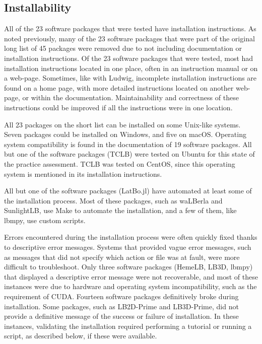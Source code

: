 \documentclass[final, 3p, times, authoryear]{elsarticle}
\begin{document}
\subsection{Installability}

All of the 23 software packages that were tested have installation instructions.
As noted previously, many of the 23 software packages that were part of the
original long list of 45 packages were removed due to not including
documentation or installation instructions. Of the 23 software packages that
were tested, most had installation instructions located in one place, often in
an instruction manual or on a web-page. Sometimes, like with Ludwig, incomplete
installation instructions are found on a home page, with more detailed
instructions located on another web-page, or within the documentation.
Maintainability and correctness of these instructions could be improved if all
the instructions were in one location. 

All 23 packages on the short list can be installed on some Unix-like systems.
Seven packages could be installed on Windows, and five on macOS. Operating
system compatibility is found in the documentation of 19 software packages. All
but one of the software packages (TCLB) were tested on Ubuntu for this state of
the practice assessment. TCLB was tested on CentOS, since this operating system
is mentioned in its installation instructions.

All but one of the software packages (LatBo.jl) have automated at least some of
the installation process. Most of these packages, such as waLBerla and
SunlightLB, use Make to automate the installation, and a few of them, like
lbmpy, use custom scripts.

Errors encountered during the installation process were often quickly fixed
thanks to descriptive error messages. Systems that provided vague error
messages, such as messages that did not specify which action or file was at
fault, were more difficult to troubleshoot. Only three software packages
(HemeLB, LB3D, lbmpy) that displayed a descriptive error message were not
recoverable, and most of these instances were due to hardware and operating
system incompatibility, such as the requirement of CUDA. Fourteen software
packages definitively broke during installation. Some packages, such as
LB2D-Prime and LB3D-Prime, did not provide a definitive message of the success
or failure of installation. In these instances, validating the installation
required performing a tutorial or running a script, as described below, if these
were available. 
\end{document}
